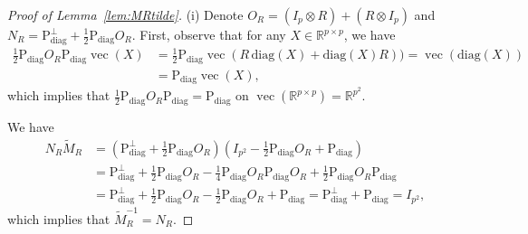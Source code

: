 \documentclass[12pt]{amsart}
\numberwithin{equation}{section}
\numberwithin{equation}{section}
\theoremstyle{plain}
\theoremstyle{definition}
\newcommand{\diag}[1]{\mathrm{diag}(#1)}
\newcommand{\R}{\mathbb{R}}
\begin{document}
\begin{proof}[Proof of Lemma~\ref{lem:MRtilde}]
(i)    Denote $O_R=(I_p\otimes R)+(R\otimes I_p)$ and $N_R = \mathrm{P}_{\mathrm{diag}}^\bot+\frac12\mathrm{P}_{\mathrm{diag}} O_R$. First, observe that for any $X\in \R^{p\times p}$, we have 
    \begin{align*}
    \frac{1}{2}\mathrm{P}_{\mathrm{diag}} O_R\mathrm{P}_{\mathrm{diag}} \operatorname{vec}(X)&=\frac{1}{2}\mathrm{P}_{\mathrm{diag}}\operatorname{vec}(R\,\diag{X}+\diag{X}R))=\operatorname{vec}(\diag{X})\\
    &=\mathrm{P}_{\mathrm{diag}}\operatorname{vec}(X),
    \end{align*}
    which implies that $\frac{1}{2}\mathrm{P}_{\mathrm{diag}} O_R\mathrm{P}_{\mathrm{diag}}=\mathrm{P}_{\mathrm{diag}} $ on $\operatorname{vec}(\R^{p\times p})=\R^{p^2}$. 
    
 We have    \begin{align*}
    N_R\tilde{M}_R&= \left(\mathrm{P}_{\mathrm{diag}}^\bot+\frac12\mathrm{P}_{\mathrm{diag}} O_R\right)\left(I_{p^2}-\frac12 \mathrm{P}_{\mathrm{diag}} O_R+\mathrm{P}_{\mathrm{diag}}\right)\\
        &=\mathrm{P}_{\mathrm{diag}}^\bot + \frac12\mathrm{P}_{\mathrm{diag}}  O_R - \frac14 \mathrm{P}_{\mathrm{diag}}  O_R \mathrm{P}_{\mathrm{diag}}  O_R+ \frac12 \mathrm{P}_{\mathrm{diag}} O_R\mathrm{P}_{\mathrm{diag}} \\
        &=\mathrm{P}_{\mathrm{diag}}^\bot + \frac12\mathrm{P}_{\mathrm{diag}}  O_R - \frac12\mathrm{P}_{\mathrm{diag}}  O_R+ \mathrm{P}_{\mathrm{diag}} =\mathrm{P}_{\mathrm{diag}}^\bot+\mathrm{P}_{\mathrm{diag}} = I_{p^2},
    \end{align*}
which implies that $\tilde{M}_R^{-1}=N_R$. 


\end{proof}
\end{document}
